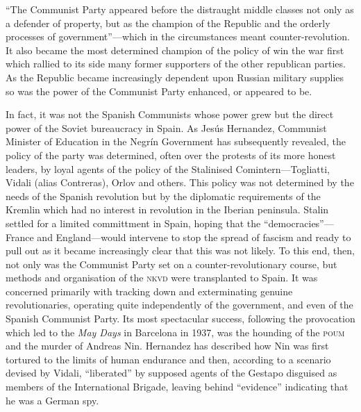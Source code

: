 ``The Communist Party appeared before the distraught middle classes not only as a defender of property, but as the champion of the Republic and the orderly processes of government''---which in the circumstances meant counter-revolution. It also became the most determined champion of the policy of win the war first which rallied to its side many former supporters of the other republican parties. As the Republic became increasingly dependent upon Russian military supplies so was the power of the Communist Party enhanced, or appeared to be.

In fact, it was not the Spanish Communists whose power grew but the direct power of the Soviet bureaucracy in Spain. As Jes\'us Hernandez, Communist Minister of Education in the Negr\'in{\indexJNegrin} Government has subsequently revealed, the policy of the party was determined, often over the protests of its more honest leaders, by loyal agents of the policy of the Stalinised Comintern---Togliatti, Vidali{\indexVVidali} (alias Contreras), Orlov and others. This policy was not determined by the needs of the Spanish revolution but by the diplomatic requirements of the Kremlin which had no interest in revolution in the Iberian peninsula. Stalin settled for a limited committment in Spain, hoping that the ``democracies''---France and England---would intervene to stop the spread of fascism and ready to pull out as it became increasingly clear that this was not likely. To this end, then, not only was the Communist Party set on a counter-revolutionary course, but methods and organisation of the \textsc{nkvd} were transplanted to Spain. It was concerned primarily with tracking down and exterminating genuine revolutionaries, operating quite independently of the government, and even of the Spanish Communist Party. Its most spectacular success, following the provocation which led to the \emph{May Days} in Barcelona in 1937, was the hounding of the \textsc{poum} and the murder of Andreas Nin.{\indexANin} Hernandez has described how Nin was first tortured to the limits of human endurance and then, according to a scenario devised by Vidali, ``liberated'' by supposed agents of the Gestapo disguised as members of the International Brigade, leaving behind ``evidence'' indicating that he was a German spy.

